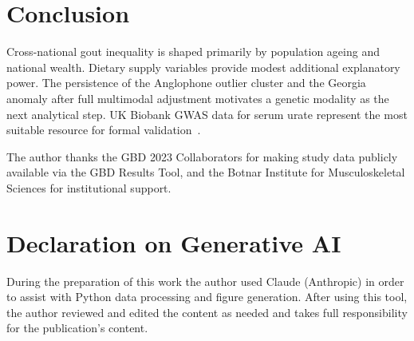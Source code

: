 \documentclass[]{ceurart}
\begin{document}
\section{Conclusion}

Cross-national gout inequality is shaped primarily by population ageing and
national wealth. Dietary supply variables provide modest additional explanatory
power. The persistence of the Anglophone outlier cluster and the Georgia
anomaly after full multimodal adjustment motivates a genetic modality as the
next analytical step. UK Biobank GWAS data for serum urate represent the most
suitable resource for formal validation~\cite{tin2019}.

\begin{acknowledgments}
The author thanks the GBD 2023 Collaborators for making study data publicly
available via the GBD Results Tool, and the Botnar Institute for
Musculoskeletal Sciences for institutional support.
\end{acknowledgments}

\section*{Declaration on Generative AI}
During the preparation of this work the author used Claude (Anthropic) in
order to assist with Python data processing and figure generation. After using
this tool, the author reviewed and edited the content as needed and takes full
responsibility for the publication's content.


\end{document}
